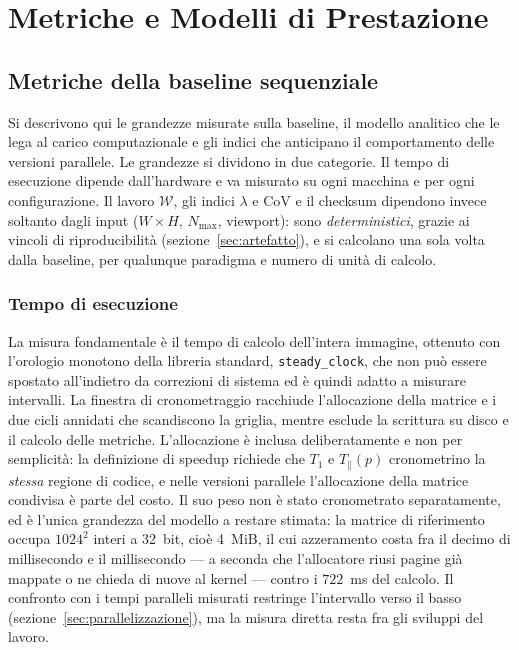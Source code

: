 \section{Metriche e Modelli di Prestazione}

\subsection{Metriche della baseline sequenziale}
\label{sec:metriche-seriale}

Si descrivono qui le grandezze misurate sulla baseline, il modello analitico che
le lega al carico computazionale e gli indici che anticipano il comportamento
delle versioni parallele. Le grandezze si dividono in due categorie. Il tempo di
esecuzione dipende dall'hardware e va misurato su ogni macchina e per ogni
configurazione. Il lavoro $\mathcal{W}$, gli indici $\lambda$ e CoV e il
checksum dipendono invece soltanto dagli input ($W\times H$, $N_{\max}$,
viewport): sono \emph{deterministici}, grazie ai vincoli di riproducibilità
(sezione~\ref{sec:artefatto}), e si calcolano una sola volta dalla baseline, per
qualunque paradigma e numero di unità di calcolo.

\subsubsection{Tempo di esecuzione}
\label{sec:serial-time}

La misura fondamentale è il tempo di calcolo dell'intera immagine, ottenuto con
l'orologio monotono della libreria standard, \texttt{steady\_clock}, che non può
essere spostato all'indietro da correzioni di sistema ed è quindi adatto a
misurare intervalli. La finestra di cronometraggio racchiude l'allocazione della
matrice e i due cicli annidati che scandiscono la griglia, mentre esclude la
scrittura su disco e il calcolo delle metriche. L'allocazione è inclusa
deliberatamente e non per semplicità: la definizione di speedup richiede che
$T_1$ e $T_\parallel(p)$ cronometrino la \emph{stessa} regione di codice, e
nelle versioni parallele l'allocazione della matrice condivisa è parte del
costo. Il suo peso non è stato cronometrato separatamente, ed è l'unica
grandezza del modello a restare stimata: la matrice di riferimento occupa
$1024^2$ interi a 32~bit, cioè 4~MiB, il cui azzeramento costa fra il decimo di
millisecondo e il millisecondo --- a seconda che l'allocatore riusi pagine già
mappate o ne chieda di nuove al kernel --- contro i $722$~ms del calcolo. Il
confronto con i tempi paralleli misurati restringe l'intervallo verso il basso
(sezione~\ref{sec:parallelizzazione}), ma la misura diretta resta fra gli
sviluppi del lavoro.

